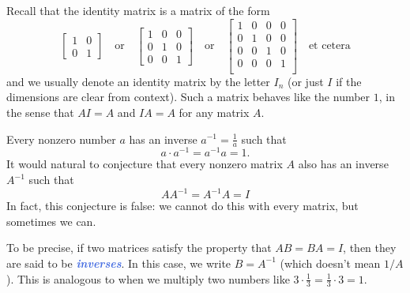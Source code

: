 \documentclass[10pt]{article}
\newcommand{\demph}[1]{\textcolor{RoyalBlue}{\textbf{\slshape #1}}} %
\theoremstyle{definition}
\begin{document}
Recall that the identity matrix is a matrix of the form
\begin{equation*}
  \begin{bmatrix}
    1&0\\
    0&1
  \end{bmatrix}
  \quad \text{or} \quad
  \begin{bmatrix}
    1&0&0\\
    0&1&0\\
    0&0&1
  \end{bmatrix}
  \quad \text{or} \quad
  \begin{bmatrix}
    1&0&0&0\\
    0&1&0&0\\
    0&0&1&0\\
    0&0&0&1\\
  \end{bmatrix}
  \quad \text{et cetera}
\end{equation*}
and we usually denote an identity matrix by the letter $I_{n}$ (or just $I$ if
the dimensions are clear from context). Such a matrix behaves like the number
$1$, in the sense that $AI=A$ and $IA=A$ for any matrix $A$.

Every nonzero number $a$ has an inverse $a^{-1}=\frac{1}{a}$ such that
\begin{equation*}
  a\cdot a^{-1} = a^{-1}a = 1.
\end{equation*}
It would natural to conjecture that every nonzero matrix $A$ also has an
inverse $A^{-1}$ such that
\begin{equation*}
  AA^{-1}=A^{-1}A = I
\end{equation*}
In fact, this conjecture is false: we cannot do this with every matrix, but
sometimes we can.

To be precise, if two matrices satisfy the property that $AB=BA=I$, then they
are said to be \demph{inverses}. In this case, we write $B=A^{-1}$ (which
doesn't mean $1/A$). This is analogous to when we multiply two numbers like
$3\cdot \frac{1}{3}= \frac{1}{3}\cdot 3=1$.
\end{document}
